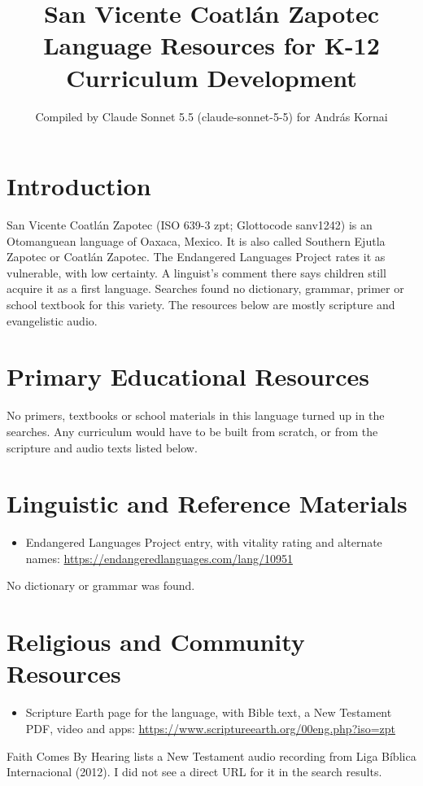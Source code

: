 \documentclass[12pt]{article}
\title{San Vicente Coatl\'an Zapotec Language Resources for K-12 Curriculum Development}
\author{Compiled by Claude Sonnet 5.5 (claude-sonnet-5-5) for Andr\'as Kornai}
\date{}
\begin{document}
\maketitle

\section{Introduction}
San Vicente Coatl\'an Zapotec (ISO 639-3 zpt; Glottocode sanv1242) is an Otomanguean language of Oaxaca, Mexico. It is also called Southern Ejutla Zapotec or Coatl\'an Zapotec. The Endangered Languages Project rates it as vulnerable, with low certainty. A linguist's comment there says children still acquire it as a first language. Searches found no dictionary, grammar, primer or school textbook for this variety. The resources below are mostly scripture and evangelistic audio.

\section{Primary Educational Resources}
No primers, textbooks or school materials in this language turned up in the searches. Any curriculum would have to be built from scratch, or from the scripture and audio texts listed below.

\section{Linguistic and Reference Materials}
\begin{itemize}
\item Endangered Languages Project entry, with vitality rating and alternate names: \url{https://endangeredlanguages.com/lang/10951}
\end{itemize}
No dictionary or grammar was found.

\section{Religious and Community Resources}
\begin{itemize}
\item Scripture Earth page for the language, with Bible text, a New Testament PDF, video and apps: \url{https://www.scriptureearth.org/00eng.php?iso=zpt}
\end{itemize}
Faith Comes By Hearing lists a New Testament audio recording from Liga B\'iblica Internacional (2012). I did not see a direct URL for it in the search results.
\end{document}
